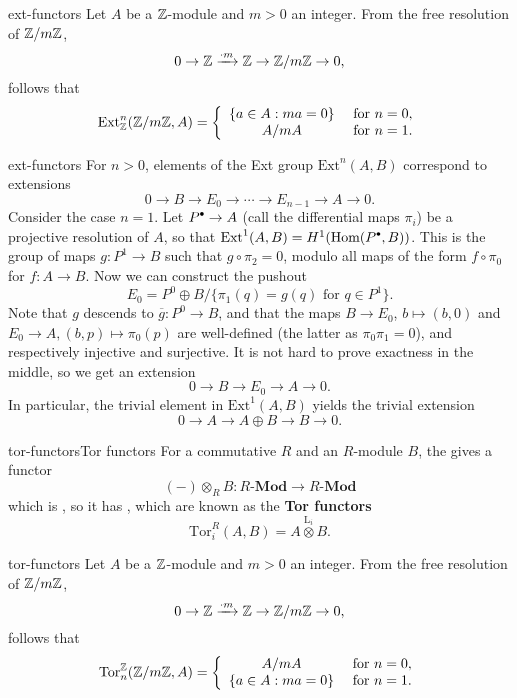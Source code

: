 \begin{example}{ext-functors}
    Let $A$ be a $\mathbb{Z}$-module and $m > 0$ an integer. From the free resolution of $\mathbb{Z}/m\mathbb{Z}$,
    \[ 0 \to \mathbb{Z} \xrightarrow{\cdot m} \mathbb{Z} \to \mathbb{Z} / m \mathbb{Z} \to 0 , \]
    follows that
    \[ \textup{Ext}^n_{\mathbb{Z}}(\mathbb{Z}/m\mathbb{Z}, A) = \left\{ \begin{array}{cl} \{ a \in A : ma = 0 \} & \textup{ for } n = 0 , \\ A/mA & \textup{ for } n = 1 . \end{array} \right. \]
\end{example}

\begin{example}{ext-functors}
    For $n > 0$, elements of the Ext group $\text{Ext}^n(A, B)$ correspond to extensions
    \[ 0 \to B \to E_0 \to \cdots \to E_{n - 1} \to A \to 0 . \]
    Consider the case $n = 1$. Let $P^\bdot \to A$ (call the differential maps $\pi_i$) be a projective resolution of $A$, so that $\text{Ext}^1(A, B) = H^1(\Hom(P^\bdot, B))$. This is the group of maps $g : P^1 \to B$ such that $g \circ \pi_2 = 0$, modulo all maps of the form $f \circ \pi_0$ for $f : A \to B$. Now we can construct the pushout
    \[ E_0 = P^0 \oplus B / \{ \pi_1(q) = g(q) \text{ for } q \in P^1 \} . \]
    Note that $g$ descends to $\overline{g} : P^0 \to B$, and that the maps $B \to E_0$, $b \mapsto (b, 0)$ and $E_0 \to A, (b, p) \mapsto \pi_0(p)$ are well-defined (the latter as $\pi_0 \pi_1 = 0$), and respectively injective and surjective. It is not hard to prove exactness in the middle, so we get an extension
    \[ 0 \to B \to E_0 \to A \to 0 . \]
    In particular, the trivial element in $\text{Ext}^1(A, B)$ yields the trivial extension
    \[ 0 \to A \to A \oplus B \to B \to 0 . \]
\end{example}

\begin{topic}{tor-functors}{Tor functors}
    For a commutative  $R$ and an $R$-module $B$, the  gives a functor
    \[ (-) \otimes_R B : R\textbf{-Mod} \to R\textbf{-Mod} \]
    which is , so it has , which are known as the \textbf{Tor functors}
    \[ \text{Tor}^R_i(A, B) = A \overset{\text{L}_i}{\otimes} B . \]
\end{topic}

\begin{example}{tor-functors}
    Let $A$ be a $\mathbb{Z}$-module and $m > 0$ an integer. From the free resolution of $\mathbb{Z}/m\mathbb{Z}$,
    \[ 0 \to \mathbb{Z} \xrightarrow{\cdot m} \mathbb{Z} \to \mathbb{Z} / m \mathbb{Z} \to 0 , \]
    follows that
    \[ \textup{Tor}_n^{\mathbb{Z}}(\mathbb{Z}/m\mathbb{Z}, A) = \left\{ \begin{array}{cl} A/mA & \textup{ for } n = 0 , \\ \{ a \in A : ma = 0 \} & \textup{ for } n = 1 . \end{array} \right. \]
\end{example}

